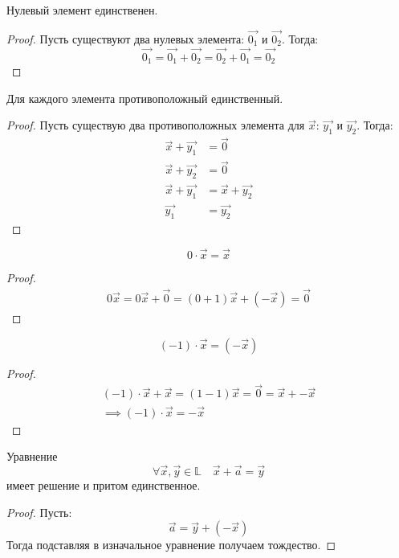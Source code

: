 \begin{property}
    Нулевый элемент единственен.
\end{property}
\begin{proof}
    Пусть существуют два нулевых элемента: $\vec{0_1}$ и $\vec{0_2}$. Тогда: \[
        \vec{0_1} = \vec{0_1} + \vec{0_2} = \vec{0_2} + \vec{0_1} = \vec{0_2}
    \]
\end{proof}

\begin{property}
    Для каждого элемента противоположный единственный.
\end{property}
\begin{proof}
    Пусть существую два противоположных элемента для $\vec{x}$: $\vec{y_1}$ и $\vec{y_2}$. Тогда:
    \begin{align*}
        \vec{x} + \vec{y_1} &= \vec{0} \\
        \vec{x} + \vec{y_2} &= \vec{0} \\
        \vec{x} + \vec{y_1} &= \vec{x} + \vec{y_2} \\
        \vec{y_1} &= \vec{y_2}
    \end{align*}
\end{proof}

\begin{property}
    \[
        0 \cdot \vec{x} = \vec{x}
    \]
\end{property}
\begin{proof}
    \begin{gather*}
        0 \vec{x} = 0 \vec{x} + \vec{0} = (0 + 1) \vec{x} + (-\vec{x}) = \vec{0}
    \end{gather*} 
\end{proof}

\begin{property}
    \[
        (-1) \cdot \vec{x} = (- \vec{x})
    \]
\end{property}
\begin{proof}
    \begin{gather*}
        (-1) \cdot \vec{x} + \vec{x} = (1 - 1) \vec{x} = \vec{0} = \vec{x} + -\vec{x} \\
        \implies (-1) \cdot \vec{x} = -\vec{x}
    \end{gather*}
\end{proof}

\begin{property}
    Уравнение \[
        \forall \vec{x}, \vec{y} \in \mathbb{L} \quad \vec{x} + \vec{a} = \vec{y}
    \]
    имеет решение и притом единственное.
\end{property}
\begin{proof}
    Пусть: \[
        \vec{a} = \vec{y} + (-\vec{x})
    \]
    Тогда подставляя в изначальное уравнение получаем тождество.
\end{proof}

